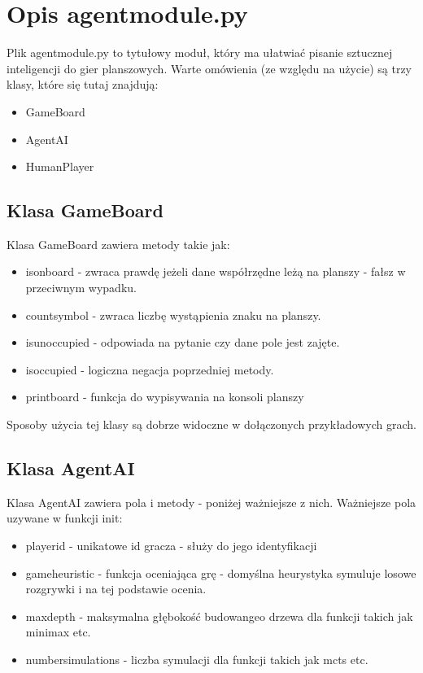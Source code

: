 \documentclass[polish,shortabstract,inz]{iithesis}
\begin{document}
\section{Opis agent\textunderscore module.py}
Plik agent\textunderscore module.py to tytułowy moduł, który ma ułatwiać pisanie sztucznej inteligencji do gier planszowych.
Warte omówienia (ze względu na użycie) są trzy klasy, które się tutaj znajdują:
\begin{itemize}
  \item GameBoard
  \item AgentAI
  \item HumanPlayer
\end{itemize}

\subsection{Klasa GameBoard}
Klasa GameBoard zawiera metody takie jak:
\begin{itemize}
  \item is\textunderscore on\textunderscore board - zwraca prawdę jeżeli dane współrzędne leżą na planszy - fałsz w przeciwnym wypadku.
  \item count\textunderscore symbol - zwraca liczbę wystąpienia znaku na planszy.
  \item is\textunderscore unoccupied - odpowiada na pytanie czy dane pole jest zajęte.
  \item is\textunderscore occupied - logiczna negacja poprzedniej metody.
  \item print\textunderscore board - funkcja do wypisywania na konsoli planszy
\end{itemize}
Sposoby użycia tej klasy są dobrze widoczne w dołączonych przykładowych grach.

\subsection{Klasa AgentAI}
Klasa AgentAI zawiera pola i metody - poniżej ważniejsze z nich.
Ważniejsze pola uzywane w funkcji init:
\begin{itemize}
  \item player\textunderscore id - unikatowe id gracza - służy do jego identyfikacji
  \item game\textunderscore heuristic - funkcja oceniająca grę - domyślna heurystyka symuluje losowe rozgrywki i na tej podstawie ocenia.
  \item max\textunderscore depth - maksymalna głębokość budowangeo drzewa dla funkcji takich jak minimax etc.
  \item number\textunderscore simulations - liczba symulacji dla funkcji takich jak mcts etc.
\end{itemize}
\end{document}
